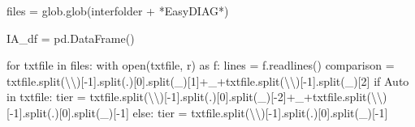 \documentclass[
  letterpaper,
  DIV=11,
  numbers=noendperiod]{scrreprt}
\newenvironment{Shaded}{\begin{snugshade}}{\end{snugshade}}
\newcommand{\BuiltInTok}[1]{\textcolor[rgb]{0.00,0.23,0.31}{#1}}
\newcommand{\CharTok}[1]{\textcolor[rgb]{0.13,0.47,0.30}{#1}}
\newcommand{\ControlFlowTok}[1]{\textcolor[rgb]{0.00,0.23,0.31}{#1}}
\newcommand{\DecValTok}[1]{\textcolor[rgb]{0.68,0.00,0.00}{#1}}
\newcommand{\ImportTok}[1]{\textcolor[rgb]{0.00,0.46,0.62}{#1}}
\newcommand{\KeywordTok}[1]{\textcolor[rgb]{0.00,0.23,0.31}{#1}}
\newcommand{\NormalTok}[1]{\textcolor[rgb]{0.00,0.23,0.31}{#1}}
\newcommand{\OperatorTok}[1]{\textcolor[rgb]{0.37,0.37,0.37}{#1}}
\newcommand{\StringTok}[1]{\textcolor[rgb]{0.13,0.47,0.30}{#1}}
\begin{document}
\begin{Shaded}
\begin{Highlighting}[]
\NormalTok{files }\OperatorTok{=}\NormalTok{ glob.glob(interfolder }\OperatorTok{+} \StringTok{\textquotesingle{}*EasyDIAG*\textquotesingle{}}\NormalTok{)}

\NormalTok{IA\_df }\OperatorTok{=}\NormalTok{ pd.DataFrame()}

\ControlFlowTok{for}\NormalTok{ txtfile }\KeywordTok{in}\NormalTok{ files:}
    \ControlFlowTok{with} \BuiltInTok{open}\NormalTok{(txtfile, }\StringTok{\textquotesingle{}r\textquotesingle{}}\NormalTok{) }\ImportTok{as}\NormalTok{ f:}
\NormalTok{        lines }\OperatorTok{=}\NormalTok{ f.readlines()}
\NormalTok{    comparison }\OperatorTok{=}\NormalTok{ txtfile.split(}\StringTok{\textquotesingle{}}\CharTok{\textbackslash{}\textbackslash{}}\StringTok{\textquotesingle{}}\NormalTok{)[}\OperatorTok{{-}}\DecValTok{1}\NormalTok{].split(}\StringTok{\textquotesingle{}.\textquotesingle{}}\NormalTok{)[}\DecValTok{0}\NormalTok{].split(}\StringTok{\textquotesingle{}\_\textquotesingle{}}\NormalTok{)[}\DecValTok{1}\NormalTok{]}\OperatorTok{+}\StringTok{\textquotesingle{}\_\textquotesingle{}}\OperatorTok{+}\NormalTok{txtfile.split(}\StringTok{\textquotesingle{}}\CharTok{\textbackslash{}\textbackslash{}}\StringTok{\textquotesingle{}}\NormalTok{)[}\OperatorTok{{-}}\DecValTok{1}\NormalTok{].split(}\StringTok{\textquotesingle{}\_\textquotesingle{}}\NormalTok{)[}\DecValTok{2}\NormalTok{]}
    \ControlFlowTok{if} \StringTok{\textquotesingle{}Auto\textquotesingle{}} \KeywordTok{in}\NormalTok{ txtfile:}
\NormalTok{        tier }\OperatorTok{=}\NormalTok{ txtfile.split(}\StringTok{\textquotesingle{}}\CharTok{\textbackslash{}\textbackslash{}}\StringTok{\textquotesingle{}}\NormalTok{)[}\OperatorTok{{-}}\DecValTok{1}\NormalTok{].split(}\StringTok{\textquotesingle{}.\textquotesingle{}}\NormalTok{)[}\DecValTok{0}\NormalTok{].split(}\StringTok{\textquotesingle{}\_\textquotesingle{}}\NormalTok{)[}\OperatorTok{{-}}\DecValTok{2}\NormalTok{]}\OperatorTok{+}\StringTok{\textquotesingle{}\_\textquotesingle{}}\OperatorTok{+}\NormalTok{txtfile.split(}\StringTok{\textquotesingle{}}\CharTok{\textbackslash{}\textbackslash{}}\StringTok{\textquotesingle{}}\NormalTok{)[}\OperatorTok{{-}}\DecValTok{1}\NormalTok{].split(}\StringTok{\textquotesingle{}.\textquotesingle{}}\NormalTok{)[}\DecValTok{0}\NormalTok{].split(}\StringTok{\textquotesingle{}\_\textquotesingle{}}\NormalTok{)[}\OperatorTok{{-}}\DecValTok{1}\NormalTok{]}
    \ControlFlowTok{else}\NormalTok{:}
\NormalTok{        tier }\OperatorTok{=}\NormalTok{ txtfile.split(}\StringTok{\textquotesingle{}}\CharTok{\textbackslash{}\textbackslash{}}\StringTok{\textquotesingle{}}\NormalTok{)[}\OperatorTok{{-}}\DecValTok{1}\NormalTok{].split(}\StringTok{\textquotesingle{}.\textquotesingle{}}\NormalTok{)[}\DecValTok{0}\NormalTok{].split(}\StringTok{\textquotesingle{}\_\textquotesingle{}}\NormalTok{)[}\OperatorTok{{-}}\DecValTok{1}\NormalTok{]}



\end{Highlighting}
\end{Shaded}
\end{document}
